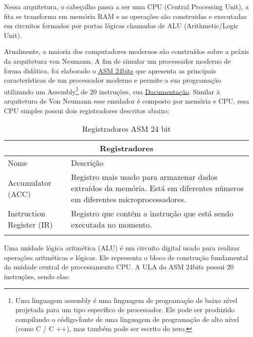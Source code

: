 Nessa arquitetura, o cabeçalho passa a ser uma CPU (Central Processing Unit), a fita se transforma em memória RAM e as operações são construidas e executadas em circuitos formados por portas lógicas chamadas de ALU (Arithmetic/Logic Unit).\cite{12}

Atualmente, a maioria dos computadores modernos são construídos sobre a práxis da arquitetura von Neumann. A fim de simular um processador moderno de forma didática, foi elaborado o \href{https://gzsig.io/vm-24bits/}{ASM 24bits} que apresenta as principais características de um processador moderno e permite a sua programação utilizando um Assembly\footnote{Uma linguagem assembly é uma linguagem de programação de baixo nível projetada para um tipo específico de processador. Ele pode ser produzido compilando o código-fonte de uma linguagem de programação de alto nível (como C / C ++), mas também pode ser escrito do zero.} de 20 instruções, sua \href{https://github.com/gzsig/Asm/blob/master/README.md}{Documentação}. Similar à arquitetura de Von Neumann esse emulador é composto por memória e CPU, essa CPU simples possui dois registradores descritos abaixo:

\vspace{1cm}
\begin{longtable}{ |p{3cm}||p{11cm}|  }
  \hline
  \multicolumn{2}{|c|}{Registradores} \\
  \hline
    Nome &
    Descrição\\
  \hline
    Accumulator (ACC) &
    Registro mais usado para armazenar dados extraídos da memória. Está em diferentes números em diferentes microprocessadores. \\
  \hline
    Instruction Register (IR) &
    Registro que contém a instrução que está sendo executada no momento. \\
  \hline
  \caption{Registradores ASM 24 bit}
  \label{table:1}
\end{longtable}
\vspace{1cm}

Uma unidade lógica aritmética (ALU) é um circuito digital usado para realizar operações aritméticas e lógicas. Ele representa o bloco de construção fundamental da unidade central de processamento CPU. A ULA do ASM 24bits possui 20 instruções, sendo elas:

